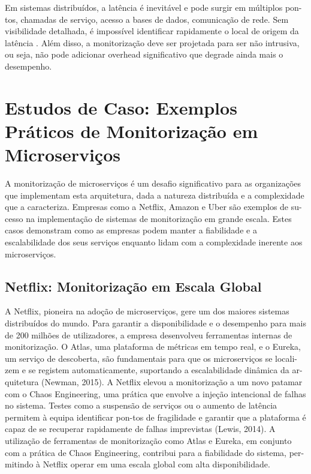 Em sistemas distribuídos, a latência é inevitável e pode surgir em múltiplos pon-tos, chamadas de serviço, acesso a bases de dados, comunicação de rede.
Sem visibilidade detalhada, é impossível identificar rapidamente o local de origem da latência \cite{Railic2021}.
Além disso, a monitorização deve ser projetada para ser não intrusiva, ou seja, não pode adicionar overhead significativo que degrade ainda mais o desempenho.


\section{Estudos de Caso: Exemplos Práticos de Monitorização em Microserviços}

A monitorização de microserviços é um desafio significativo para as organizações que implementam esta arquitetura, dada a natureza distribuída e a complexidade que a caracteriza. Empresas como a Netflix, Amazon e Uber são exemplos de su-cesso na implementação de sistemas de monitorização em grande escala. Estes casos demonstram como as empresas podem manter a fiabilidade e a escalabilidade dos seus serviços enquanto lidam com a complexidade inerente aos microserviços.

\subsection{Netflix: Monitorização em Escala Global}

A Netflix, pioneira na adoção de microserviços, gere um dos maiores sistemas distribuídos do mundo. Para garantir a disponibilidade e o desempenho para mais de 200 milhões de utilizadores, a empresa desenvolveu ferramentas internas de monitorização. O Atlas, uma plataforma de métricas em tempo real, e o Eureka, um serviço de descoberta, são fundamentais para que os microserviços se locali-zem e se registem automaticamente, suportando a escalabilidade dinâmica da ar-quitetura (Newman, 2015).
A Netflix elevou a monitorização a um novo patamar com o Chaos Engineering, uma prática que envolve a injeção intencional de falhas no sistema. Testes como a suspensão de serviços ou o aumento de latência permitem à equipa identificar pon-tos de fragilidade e garantir que a plataforma é capaz de se recuperar rapidamente de falhas imprevistas (Lewis, 2014).
A utilização de ferramentas de monitorização como Atlas e Eureka, em conjunto com a prática de Chaos Engineering, contribui para a fiabilidade do sistema, per-mitindo à Netflix operar em uma escala global com alta disponibilidade.

